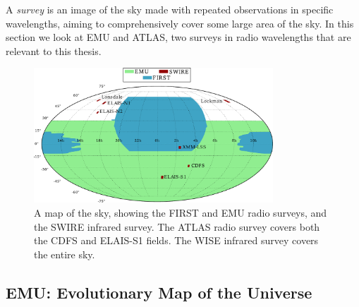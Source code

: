         A \emph{survey} is an image of the sky made with repeated observations
        in specific wavelengths, aiming to comprehensively cover some large area
        of the sky. In this section we look at EMU and ATLAS, two surveys in
        radio wavelengths that are relevant to this thesis.

        \begin{figure}[!ht]
            \centering
            \includegraphics[width=0.8\textwidth]{images/skymap2.pdf}
            \caption{A map of the sky, showing the FIRST and EMU radio surveys,
                and the SWIRE infrared survey. The ATLAS radio survey
                covers both the CDFS and ELAIS-S1 fields. The WISE infrared
                survey covers the entire sky.}
        \end{figure}

        \subsection{EMU: Evolutionary Map of the Universe}
        \label{sec:emu}

